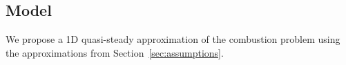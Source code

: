%	
%	
		
	\subsection{Model}
	
	We propose a 1D quasi-steady approximation of the combustion problem using the approximations from Section~\ref{sec:assumptions}.
	

	
	
	



%	
		

